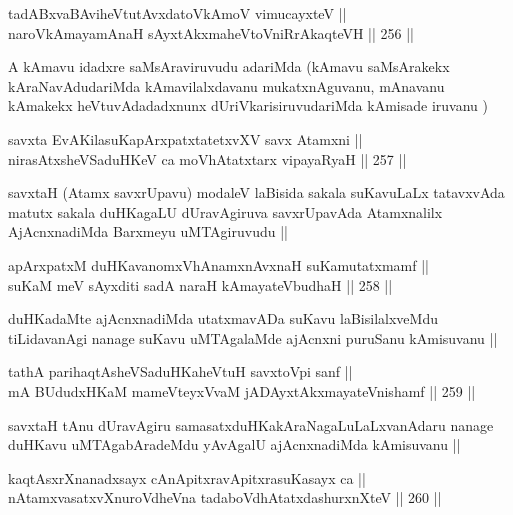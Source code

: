 \begin{shl}
tadABxvaBAviheVtutAvxdatoV\s kAmoV vimucayxteV ||  \\
naroV\s kAmayamAnaH sAyxtAkxmaheVtoVniRrAkaqteVH ||  256 ||  
\end{shl}

\begin{artha}
A kAmavu idadxre saMsAraviruvudu adariMda (kAmavu saMsArakekx
kAraNavAdudariMda kAmavilalxdavanu mukatxnAguvanu, mAnavanu kAmakekx
heVtuvAdadadxnunx dUriVkarisiruvudariMda kAmisade iruvanu )
\end{artha}


\begin{shl}
savxta EvAKilasuKapArxpatxtatetxvXV savx Atamxni || \\
nirasAtxsheVSaduHKeV ca moVhAtatxtarx vipayaRyaH ||  257 ||  
\end{shl}

\begin{artha}
savxtaH (Atamx savxrUpavu) modaleV laBisida sakala suKavuLaLx
tatavxvAda matutx sakala duHKagaLU dUravAgiruva savxrUpavAda
Atamxnalilx AjAcnxnadiMda Barxmeyu uMTAgiruvudu ||
\end{artha}


\begin{shl}
apArxpatxM duHKavanomxVhAnamxnAvxnaH suKamutatxmamf || \\
suKaM meV sAyxditi sadA naraH kAmayateV\s budhaH ||  258 ||  
\end{shl}

\begin{artha}
duHKadaMte ajAcnxnadiMda utatxmavADa suKavu laBisilalxveMdu
tiLidavanAgi nanage suKavu uMTAgalaMde ajAcnxni puruSanu kAmisuvanu ||
\end{artha}

\begin{shl}
tathA parihaqtAsheVSaduHKaheVtuH savxtoV\s pi sanf || \\
mA BUdudxHKaM mameVteyxVvaM jADAyxtAkxmayateV\s nishamf ||  259 || 
\end{shl}

\begin{artha}
savxtaH tAnu dUravAgiru samasatxduHKakAraNagaLuLaLxvanAdaru nanage
duHKavu uMTAgabAradeMdu yAvAgalU ajAcnxnadiMda kAmisuvanu ||
\end{artha}

\begin{shl}
kaqtAsxrXnanadxsayx cAnApitxravApitxrasuKasayx ca || \\
nA\s \s tamxvasatxvXnuroVdheVna tadaboVdhAtatxdashurxnXteV ||  260 ||  
\end{shl}

